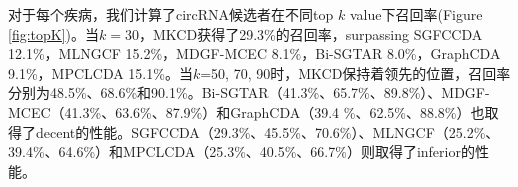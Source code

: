 \documentclass{bioinfo}
\begin{document}
\begin{methods}
对于每个疾病，我们计算了circRNA候选者在不同top $k$ value下召回率(Figure \ref{fig:topK})。当$k = 30$，MKCD获得了29.3\%的召回率，surpassing SGFCCDA 12.1\%，MLNGCF 15.2\%，MDGF-MCEC 8.1\%，Bi-SGTAR 8.0\%，GraphCDA 9.1\%，MPCLCDA 15.1\%。当$k$=50, 70, 90时，MKCD保持着领先的位置，召回率分别为48.5\%、68.6\%和90.1\%。Bi-SGTAR（41.3\%、65.7\%、89.8\%）、MDGF-MCEC（41.3\%、63.6\%、87.9\%）和GraphCDA（39.4
\%、62.5\%、88.8\%）也取得了decent的性能。SGFCCDA（29.3\%、45.5\%、70.6\%）、MLNGCF（25.2\%、39.4\%、64.6\%）和MPCLCDA（25.3\%、40.5\%、66.7\%）则取得了inferior的性能。

 









\end{methods}
\end{document}
